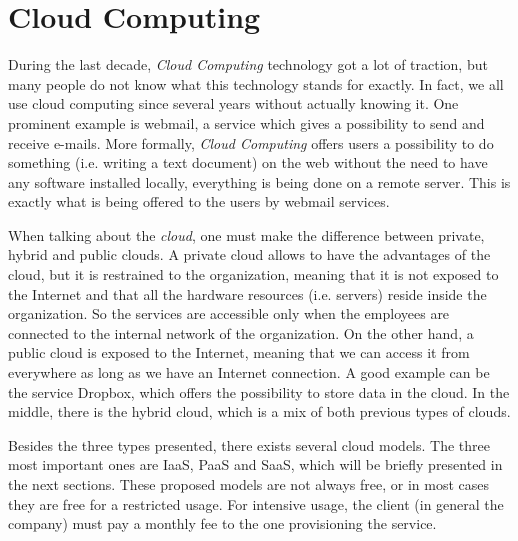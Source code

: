 

\chapter{Cloud Computing}
During the last decade, \textit{Cloud Computing} technology got a lot of traction, but many people do not know what this technology stands for exactly. 
In fact, we all use cloud computing since several years without actually knowing it. One prominent example is webmail, a service which gives a possibility to send and receive e-mails.
More formally, \textit{Cloud Computing} offers users a possibility to do something (i.e. writing a text document) on the web without the need to have any software installed locally, everything is being done on a remote server. 
This is exactly what is being offered to the users by webmail services.

When talking about the \textit{cloud}, one must make the difference between private, hybrid and public clouds. 
A private cloud allows to have the advantages of the cloud, but it is restrained to the organization, meaning that it is not exposed to the Internet and that all the hardware resources (i.e. servers) reside inside the organization. 
So the services are accessible only when the employees are connected to the internal network of the organization. 
On the other hand, a public cloud is exposed to the Internet, meaning that we can access it from everywhere as long as we have an Internet connection. 
A good example can be the service Dropbox, which offers the possibility to store data in the cloud. 
In the middle, there is the hybrid cloud, which is a mix of both previous types of clouds.

Besides the three types presented, there exists several cloud models. The three most important ones are IaaS, PaaS and SaaS, which will be briefly presented in the next sections. 
These proposed models are not always free, or in most cases they are free for a restricted usage. 
For intensive usage, the client (in general the company) must pay a monthly fee to the one provisioning the service.





